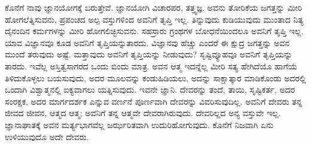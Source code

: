 ಕೊನೆಗೆ ನಾವು ಜ್ಞಾನಯೋಗಕ್ಕೆ ಬರುತ್ತೇವೆ. ಜ್ಞಾನಯೋಗಿ ವಿಚಾರಪರ, ತತ್ತ್ವಜ್ಞ. ಅವನು ತೋರಿಕೆಯ ಜಗತ್ತನ್ನು ಮೀರಿ ಹೋಗಲೆತ್ನಿಸುವನು, ಪ್ರಪಂಚದ ಅಲ್ಪ ವಸ್ತುಗಳಿಂದ ಅವನಿಗೆ ತೃಪ್ತಿ ಇಲ್ಲ. ತಿನ್ನುವುದು ಕುಡಿಯುವುದು ಮುಂತಾದ ನಿತ್ಯ ದೈನಂದಿನ ಕರ್ಮಗಳನ್ನು ಮೀರಿ ಹೋಗಲಿಚ್ಛಿಸುವನು. ಸಹಸ್ರಾರು ಗ್ರಂಥಗಳ ಬೋಧನೆಯಿಂದಲೂ ಅವನಿಗೆ ತೃಪ್ತಿ ಇಲ್ಲ. ಯಾವ ವಿಜ್ಞಾನವೂ ಕೂಡ ಅವನಿಗೆ ತೃಪ್ತಿಯನ್ನುತಾರದು. ವಿಜ್ಞಾನವು ಹೆಚ್ಚು ಎಂದರೆ ಈ ಕ್ಷುದ್ರ ಜಗತ್ತನ್ನು ಅವನ ಮುಂದೆ ತರುವುದು ಅಷ್ಟೆ. ಮತ್ತಾವುದು ಅವನಿಗೆ ತೃಪ್ತಿಯನ್ನು ನೀಡುವುದು? ಸೃಷ್ಟಿವ್ಯೂಹವೂ ಅವನಿಗೆ ತೃಪ್ತಿಯನ್ನು ತಾರದು. ಇವೆಲ್ಲ ಅಸ್ತಿತ್ವಸಾಗರದ ಒಂದು ಬಿಂದು ಮಾತ್ರ. ಅವನ ಆತ್ಮ ಇದನ್ನೆಲ್ಲ ಮೀರಿ ಸತ್ಯ ಹೇಗಿದೆಯೊ ಹಾಗೆಯೆ ತಿಳಿದುಕೊಳ್ಳಲು ಬಯಸುವುದು, ಅದರ ಮೂಲವನ್ನು ಕಂಡುಹಿಡಿಯಲು, ಅದನ್ನು ಸಾಕ್ಷಾತ್ಕಾರ ಮಾಡಿಕೊಂಡು ಅದರಲ್ಲಿ ಒಂದಾಗಿ ವಿಶ್ವಾತ್ಮನಲ್ಲಿ ಐಕ್ಯವಾಗಲು ಯತ್ನಿಸುವುದು. ಇವನೇ ಜ್ಞಾನಿ. ದೇವರನ್ನು ತಂದೆ, ತಾಯಿ, ಸೃಷ್ಟಿಕರ್ತ, ಅದರ ಸಂರಕ್ಷಕ, ಅದರ ಮಾರ್ಗದರ್ಶಕ ಎನ್ನುವ ವರ್ಣನೆ ಪೂರ್ಣವಾಗಿ ದೇವರನ್ನು ವಿವರಿಸುವುದಿಲ್ಲ. ಅವನಿಗೆ ದೇವರು ತನ್ನ ಜೀವದ ಜೀವನ, ಆತ್ಮದ ಆತ್ಮ; ಅವನಿಗೆ ತನ್ನ ಆತ್ಮವೇ ದೇವರಾಗಿರುವುದು. ದೇವರಿಲ್ಲದ ಅನ್ಯ ವಸ್ತುವೇ ಇಲ್ಲ. ಜ್ಞಾನಾಘಾತಕ್ಕೆ ಅವನ ಮರ್ತ್ಯಭಾಗವೆಲ್ಲ ಜರ್ಝರಿತವಾಗಿ ಉದುರಿಹೋಗುವುದು. ಕೊನೆಗೆ ನಿಜವಾಗಿ ಏನು ಉಳಿಯುವುದೊ ಅದೇ ದೇವರು.

